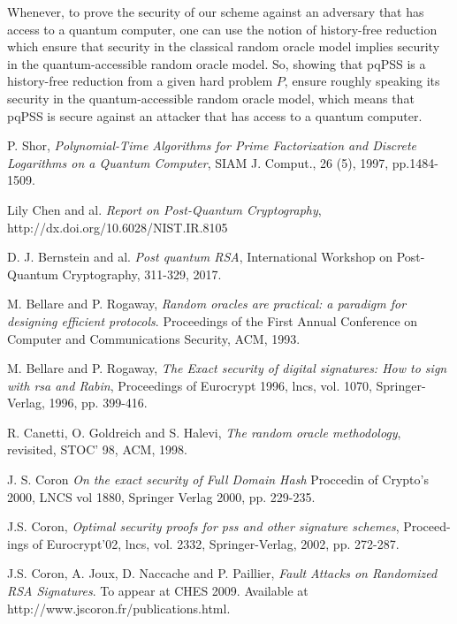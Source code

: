 \documentclass[a4paper,11pt]{article}
\begin{document}
Whenever, to prove the security of our scheme against an adversary that has access to a quantum computer, one can use the notion of history-free reduction which ensure that security in the classical random oracle model implies security in the quantum-accessible random oracle model.
So, showing that pqPSS is a history-free reduction from a given hard problem $P$, ensure  roughly speaking its security in the  quantum-accessible random oracle model, which means that pqPSS is secure against an attacker that has access to a quantum computer. 





\begin{thebibliography}{10}
 P. Shor,
\emph{ Polynomial-Time Algorithms for Prime Factorization and Discrete Logarithms on a Quantum Computer},  SIAM J. Comput., 26 (5), 1997, pp.1484-1509.

 Lily Chen and al.
\emph{Report on Post-Quantum Cryptography}, http://dx.doi.org/10.6028/NIST.IR.8105

D. J. Bernstein and al.
\emph{Post quantum RSA},
International Workshop on Post-Quantum Cryptography, 311-329, 2017.

 M. Bellare and P. Rogaway, \emph{Random oracles are practical: a paradigm for designing
efficient protocols}. Proceedings of the First Annual Conference on Computer and Communications Security, ACM, 1993.

 M. Bellare and P. Rogaway, \emph{The Exact security of digital signatures: How to sign
with rsa and Rabin}, Proceedings of Eurocrypt 1996, lncs, vol. 1070, Springer-Verlag, 1996, pp. 399-416.

 R. Canetti, O. Goldreich and S. Halevi, \emph{The random oracle methodology}, revisited,
STOC' 98, ACM, 1998.

 J. S. Coron \emph{On the exact security of Full Domain Hash} Proccedin of Crypto's 2000, LNCS vol 1880,  Springer Verlag 2000, pp. 229-235.

 J.S. Coron,\emph{ Optimal security proofs for pss and other signature schemes}, Proceed-
ings of Eurocrypt'02, lncs, vol. 2332, Springer-Verlag, 2002, pp. 272-287.

 J.S. Coron, A. Joux, D. Naccache and P. Paillier, \emph{Fault Attacks on Randomized RSA Signatures}. To appear at CHES 2009. Available at http://www.jscoron.fr/publications.html.


\end{thebibliography}
\end{document}
